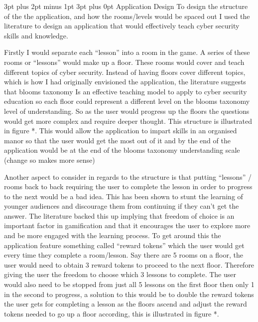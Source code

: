 \documentclass[12pt,a4paper]{article}
\makeatletter
\renewcommand\subsection{\@startsection {subsection}{1}{2mm} %
                               {3pt plus 2pt minus 1pt} %
                               {3pt plus 0pt} %
                               {\normalfont\bfseries}}
\makeatother
\begin{document}
\subsection{Application Design}  
To design the structure of the the application, and how the rooms/levels would be spaced out I used the literature to design an application that would effectively teach cyber security skills and knowledge. 

Firstly I would separate each “lesson” into a room in the game. A series of these rooms or “lessons” would make up a floor. These rooms would cover and teach different topics of cyber security. Instead of having floors cover different topics, which is how I had originally envisioned the application, the literature suggests that blooms taxonomy Is an effective teaching model to apply to cyber security education so each floor could represent a different level on the blooms taxonomy level of understanding. So as the user would progress up the floors the questions would get more complex and require deeper thought. This structure is illustrated in figure *.  This would allow the application to impart skills in an organised manor so that the user would get the most out of it and by the end of the application would be at the end of the blooms taxonomy understanding scale (change so makes more sense)


Another aspect to consider in regards to the structure is that putting “lessons” / rooms back to back requiring the user to complete the lesson in order to progress to the next would be a bad idea. This has been shown to stunt the learning of younger audiences and discourage them from continuing if they can’t get the answer. The literature backed this up implying that freedom of choice is an important factor in gamification and that it encourages the user to explore more and be more engaged with the learning process. To get around this the application feature something called “reward tokens” which the user would get every time they complete a room/lesson. Say there are 5 rooms on a floor, the user would need to obtain 3 reward tokens to proceed to the next floor. Therefore giving the user the freedom to choose which 3 lessons to complete. The user would also need to be stopped from just all 5 lessons on the first floor then only 1 in the second to progress, a solution to this would be to double the reward tokens the user gets for completing a lesson as the floors ascend and adjust the reward tokens needed to go up a floor according, this is illustrated in figure *. 
\end{document}

